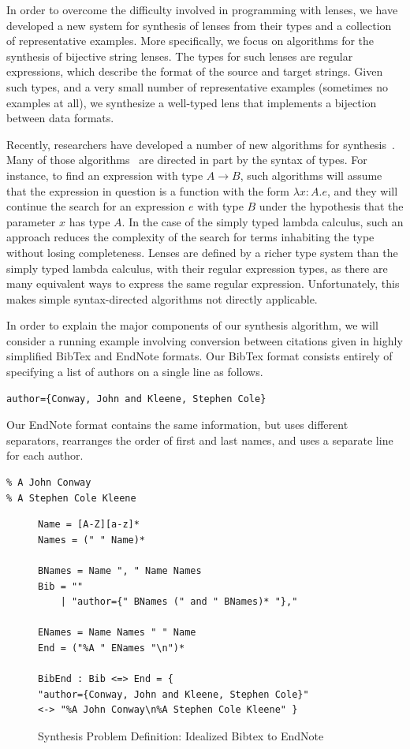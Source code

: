 \documentclass[numbers]{sigplanconf}
\begin{document}
In order to overcome the difficulty involved in programming
with lenses, we have developed a new system for synthesis of lenses
from their types and a collection of representative examples.  More
specifically, we focus on algorithms for the synthesis of bijective
string lenses.  The types for such lenses are regular expressions,
which describe the format of the source and target strings.  Given
such types, and a very small number of representative examples (sometimes
no examples at all), we synthesize a well-typed lens that implements
a bijection between data formats.

Recently, researchers have developed a number of new algorithms for
synthesis~\cite{yag+:pldi16,osera+:pldi15,frankle+:popl16,armando+:pldi16}.
Many of those
algorithms~\cite{osera+:pldi15,frankle+:popl16,armando+:pldi16} are
directed in part by the syntax of types.  For instance, to find an
expression with type $A \rightarrow B$, such algorithms will assume
that the expression in question is a function with the form $\lambda
x{:}A. e$, and they will continue the search for an expression $e$
with type $B$ under the hypothesis that the parameter $x$ has type
$A$.  In the case of the simply typed lambda calculus, such an
approach reduces the complexity of the search for terms inhabiting the
type without losing completeness.  Lenses are defined by a richer type system
than the simply typed lambda calculus,
with their regular expression types, as
there are many equivalent ways to express the same regular expression.
Unfortunately, this makes simple
syntax-directed algorithms not directly applicable.

In order to explain the major components of our synthesis algorithm,
we will consider a running example involving conversion between citations given
in highly simplified BibTex and EndNote formats.  Our BibTex format
consists entirely of specifying a list of authors on a single line as follows.
\begin{lstlisting}
author={Conway, John and Kleene, Stephen Cole}
\end{lstlisting}
Our EndNote format contains the same information, but uses different separators,
rearranges the order of first and last names, and uses a separate line for each
author. 
\begin{lstlisting}
% A John Conway
% A Stephen Cole Kleene
\end{lstlisting}

\begin{figure}
\begin{lstlisting}
Name = [A-Z][a-z]*
Names = (" " Name)*

BNames = Name ", " Name Names
Bib = ""
    | "author={" BNames (" and " BNames)* "},"

ENames = Name Names " " Name
End = ("%A " ENames "\n")*

BibEnd : Bib <=> End = {
"author={Conway, John and Kleene, Stephen Cole}"
<-> "%A John Conway\n%A Stephen Cole Kleene" }
\end{lstlisting}
  \caption{Synthesis Problem Definition: Idealized Bibtex to EndNote}
  \label{fig:bibend-spec}
\end{figure}
\end{document}
